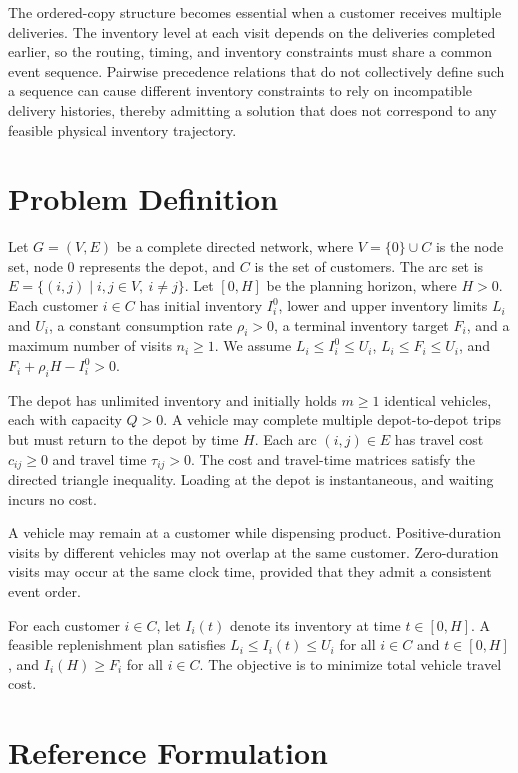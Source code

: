 \documentclass[10pt]{article}
\begin{document}
The ordered-copy structure becomes essential when a customer receives multiple deliveries. The inventory level at each visit depends on the deliveries completed earlier, so the routing, timing, and inventory constraints must share a common event sequence. Pairwise precedence relations that do not collectively define such a sequence can cause different inventory constraints to rely on incompatible delivery histories, thereby admitting a solution that does not correspond to any feasible physical inventory trajectory.


\section{Problem Definition}

Let $G=(V,E)$ be a complete directed network, where $V=\{0\}\cup C$ is the node set, node $0$ represents the depot, and $C$ is the set of customers. The arc set is $E=\{(i,j)\mid i,j\in V,\ i\ne j\}$. Let $[0,H]$ be the planning horizon, where $H>0$. Each customer $i\in C$ has initial inventory $I_i^0$, lower and upper inventory limits $L_i$ and $U_i$, a constant consumption rate $\rho_i>0$, a terminal inventory target $F_i$, and a maximum number of visits $n_i\ge1$. We assume $L_i\le I_i^0\le U_i$, $L_i\le F_i\le U_i$, and $F_i+\rho_iH-I_i^0>0$.

The depot has unlimited inventory and initially holds $m\ge1$ identical vehicles, each with capacity $Q>0$. A vehicle may complete multiple depot-to-depot trips but must return to the depot by time $H$. Each arc $(i,j)\in E$ has travel cost $c_{ij}\ge0$ and travel time $\tau_{ij}>0$. The cost and travel-time matrices satisfy the directed triangle inequality. Loading at the depot is instantaneous, and waiting incurs no cost.

A vehicle may remain at a customer while dispensing product. Positive-duration visits by different vehicles may not overlap at the same customer. Zero-duration visits may occur at the same clock time, provided that they admit a consistent event order.

For each customer $i\in C$, let $I_i(t)$ denote its inventory at time $t\in[0,H]$. A feasible replenishment plan satisfies $L_i\le I_i(t)\le U_i$ for all $i\in C$ and $t\in[0,H]$, and $I_i(H)\ge F_i$ for all $i\in C$. The objective is to minimize total vehicle travel cost.

\section{Reference Formulation}
\end{document}
